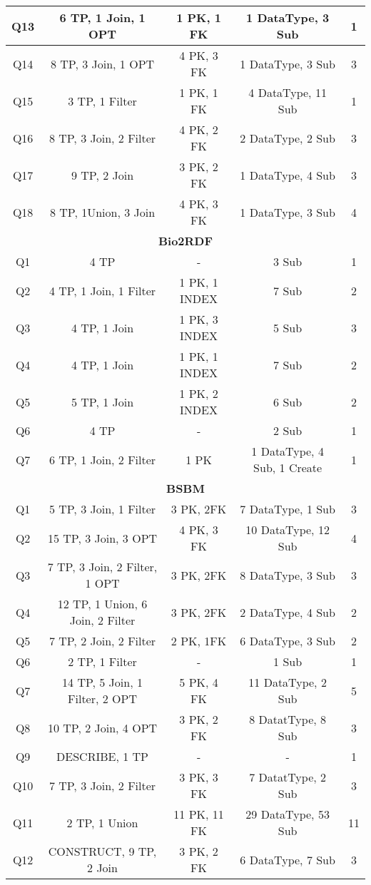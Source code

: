 \begin{table}[th]
{\begin{tabular}{c|c|c|c|c}
Q13 & 6 TP, 1 Join, 1 OPT & 1 PK, 1 FK & 1 DataType, 3 Sub & 1 \\ \hline
Q14 & 8 TP, 3 Join, 1 OPT & 4 PK, 3 FK & 1 DataType, 3 Sub & 3 \\ \hline
Q15 & 3 TP, 1 Filter & 1 PK, 1 FK & 4 DataType, 11 Sub & 1 \\ \hline
Q16 & 8 TP, 3 Join, 2 Filter & 4 PK, 2 FK & 2 DataType, 2 Sub & 3 \\ \hline
Q17 & 9 TP, 2 Join & 3 PK, 2 FK & 1 DataType, 4 Sub & 3 \\ \hline
Q18 & 8 TP, 1Union, 3 Join & 4 PK, 3 FK & 1 DataType, 3 Sub & 4 \\ \hline
\multicolumn{5}{c}{\textbf{Bio2RDF}} \\ \hline
Q1 & 4 TP & - & 3 Sub & 1 \\ \hline
Q2 & 4 TP, 1 Join, 1 Filter & 1 PK, 1 INDEX & 7 Sub & 2 \\ \hline
Q3 & 4 TP, 1 Join & 1 PK, 3 INDEX & 5 Sub & 3 \\ \hline
Q4 & 4 TP, 1 Join & 1 PK, 1 INDEX & 7 Sub & 2 \\ \hline
Q5 & 5 TP, 1 Join & 1 PK, 2 INDEX & 6 Sub & 2 \\ \hline
Q6 & 4 TP & - & 2 Sub & 1 \\ \hline
Q7 & 6 TP, 1 Join, 2 Filter & 1 PK & 1 DataType, 4 Sub, 1 Create & 1 \\ \hline
\multicolumn{5}{c}{\textbf{BSBM}} \\ \hline
Q1 & 5 TP, 3 Join, 1 Filter & 3 PK, 2FK & 7 DataType, 1 Sub & 3 \\ \hline
Q2 & 15 TP, 3 Join, 3 OPT & 4 PK, 3 FK & 10 DataType, 12 Sub & 4 \\ \hline
Q3 & 7 TP, 3 Join, 2 Filter, 1 OPT & 3 PK, 2FK & 8 DataType, 3 Sub & 3 \\ \hline
Q4 & 12 TP, 1 Union, 6 Join, 2 Filter & 3 PK, 2FK & 2 DataType, 4 Sub & 2 \\ \hline
Q5 & 7 TP, 2 Join, 2 Filter & 2 PK, 1FK & 6 DataType, 3 Sub & 2 \\ \hline
Q6 & 2 TP, 1 Filter & - & 1 Sub & 1 \\ \hline
Q7 & 14 TP, 5 Join, 1 Filter, 2 OPT & 5 PK, 4 FK & 11 DataType, 2 Sub & 5 \\ \hline
Q8 & 10 TP, 2 Join, 4 OPT & 3 PK, 2 FK & 8 DatatType, 8 Sub & 3 \\ \hline
Q9 & DESCRIBE, 1 TP & - & - & 1 \\ \hline
Q10 & 7 TP, 3 Join, 2 Filter & 3 PK, 3 FK & 7 DatatType, 2 Sub & 3 \\ \hline
Q11 & 2 TP, 1 Union & 11 PK, 11 FK & 29 DataType, 53 Sub & 11 \\ \hline
Q12 & CONSTRUCT, 9 TP, 2 Join & 3 PK, 2 FK & 6 DataType, 7 Sub & 3 \\ \hline
\end{tabular}%
}
\end{table}